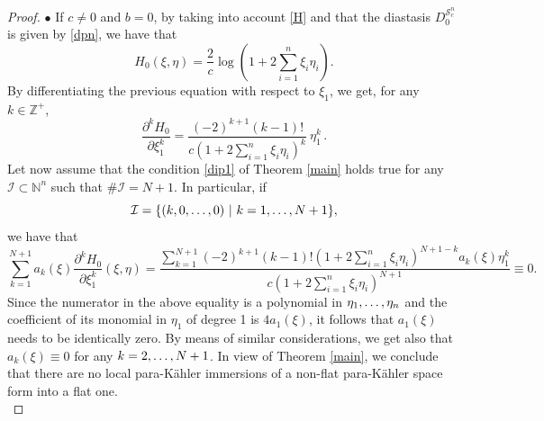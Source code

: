 \documentclass{article}
\newcommand{\I}{\mathcal{I}}
\newcommand{\de}{\partial}
\newcommand{\s}{\mathcal{S}}
\newcommand{\pk}{para-K\"ahler }
\newcommand{\Z}{\mathds{Z}}
\newcommand{\N}{\mathds{N}}
\begin{document}
\begin{proof}
\medskip
\noindent
$\bullet$ If $c\neq 0$ and $b= 0$, by taking into account   \eqref{H} and that the diastasis $D_0^{\s_c^n}$ is given by \eqref{dpn}, we have that
$$H_0(\xi,\eta)= \frac{2}{c}\log\left( 1+2\sum_{i=1}^n \xi_i\eta_i\right).$$
By differentiating the previous equation with respect to  $\xi_1$, we get, for any $k\in\Z^+$,
$$\frac{\de^k H_0}{\de \xi_1^{k}} = \frac{(-2)^{k+1}(k-1)!}{c \left( 1+2\sum_{i=1}^n \xi_i\eta_i\right)^k}\ \eta_1^k\,.$$
Let now assume that the condition \eqref{dip1} of Theorem \ref{main} holds true for any  $\I\subset \N^n$ such that $\#\I=N+1$. In particular, if 
\begin{equation}\label{II}
\I=\{(k,0,\mathellipsis,0)\ |\ k=1,\mathellipsis,N+1\},\end{equation}
we have that
$$\sum_{k=1}^{N+1} a_k(\xi) \frac{\de^k H_0}{\de \xi_1^{k}} (\xi,\eta)=\frac{ \sum_{k=1}^{N+1} (-2)^{k+1}(k-1)!  \left( 1+2\sum_{i=1}^n \xi_i\eta_i\right)^{N+1-k} a_k(\xi) \eta_1^k}{c \left( 1+2\sum_{i=1}^n \xi_i\eta_i\right)^{N+1}} \equiv 0.$$
%
%
%
Since the numerator in the above equality is a polynomial in $\eta_1,\mathellipsis,\eta_n$ and the coefficient of its monomial in $\eta_1$ of degree 1 is $4a_1(\xi)$, it follows that $a_1(\xi)$ needs to be identically zero.
 By means of similar considerations, we get also that $a_k(\xi)\equiv 0$ for any  $k=2,\mathellipsis,N+1$.
In view of  Theorem  \ref{main}, we  conclude that there  are no local  \pk immersions of a non-flat \pk space form into a flat one.\\



\end{proof}
\end{document}
